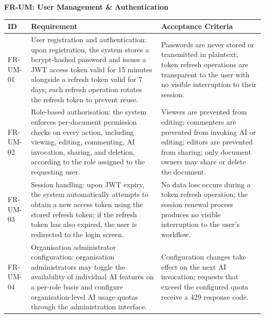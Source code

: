 \documentclass{article}
\begin{document}
\vspace{10pt}
\noindent\textbf{FR-UM: User Management \& Authentication}
\vspace{5pt}

\noindent
{\small
\begin{tabularx}{\textwidth}{|>{\hsize=0.4\hsize\raggedright\arraybackslash}X|>{\hsize=1.3\hsize\raggedright\arraybackslash}X|>{\hsize=1.3\hsize\raggedright\arraybackslash}X|}
    \hline
    \rowcolor{tableBlue} 
    \textbf{\color{white}ID} & 
    \textbf{\color{white}Requirement} & 
    \textbf{\color{white}Acceptance Criteria} \\
    \hline
    FR-UM-01 &
    User registration and authentication: upon registration, the system stores a bcrypt-hashed password and issues a JWT access token valid for 15 minutes alongside a refresh token valid for 7 days; each refresh operation rotates the refresh token to prevent reuse. &
    Passwords are never stored or transmitted in plaintext; token refresh operations are transparent to the user with no visible interruption to their session. \\
    \hline
    FR-UM-02 &
    Role-based authorisation: the system enforces per-document permission checks on every action, including viewing, editing, commenting, AI invocation, sharing, and deletion, according to the role assigned to the requesting user. &
    Viewers are prevented from editing; commenters are prevented from invoking AI or editing; editors are prevented from sharing; only document owners may share or delete the document. \\
    \hline
    FR-UM-03 &
    Session handling: upon JWT expiry, the system automatically attempts to obtain a new access token using the stored refresh token; if the refresh token has also expired, the user is redirected to the login screen. &
    No data loss occurs during a token refresh operation; the session renewal process produces no visible interruption to the user's workflow. \\
    \hline
    FR-UM-04 &
    Organisation administrator configuration: organisation administrators may toggle the availability of individual AI features on a per-role basis and configure organisation-level AI usage quotas through the administration interface. &
    Configuration changes take effect on the next AI invocation; requests that exceed the configured quota receive a 429 response code. \\
    \hline
\end{tabularx}
}
\end{document}

